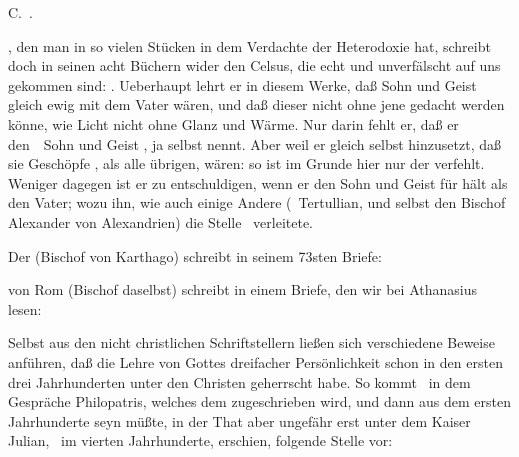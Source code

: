\vabst C.~.
\begin{aufza}
\item {}, den man in so vielen Stücken in dem Verdachte der Heterodoxie hat, schreibt doch in seinen acht Büchern wider den Celsus, die echt und unverfälscht auf uns gekommen sind: . Ueberhaupt lehrt er in diesem Werke, daß Sohn und Geist gleich ewig mit dem Vater wären, und daß dieser nicht ohne jene gedacht werden könne, wie Licht nicht ohne Glanz und Wärme. Nur darin fehlt er, daß er den~\ Sohn und Geist , ja selbst  nennt. Aber weil er gleich selbst hinzusetzt, daß sie Geschöpfe , als alle übrigen, wären: so ist im Grunde hier nur der  verfehlt. Weniger dagegen ist er zu entschuldigen, wenn er den Sohn und Geist für  hält als den Vater; wozu ihn, wie auch einige Andere (\zB\ Tertullian, und selbst den Bischof Alexander von Alexandrien) die Stelle \ verleitete.
\item Der  (Bischof von Karthago) schreibt in seinem 73sten Briefe: 
\item {} von Rom (Bischof daselbst) schreibt in einem Briefe, den wir bei Athanasius lesen: 
\end{aufza}

\begin{RWanm} 
Selbst aus den nicht christlichen Schriftstellern ließen sich verschiedene Beweise anführen, daß die Lehre von Gottes dreifacher Persönlichkeit schon in den ersten drei Jahrhunderten unter den Christen geherrscht habe. So kommt \zB\ in dem Gespräche Philopatris, welches dem  zugeschrieben wird, und dann aus dem ersten Jahrhunderte seyn müßte, in der That aber ungefähr erst unter dem Kaiser Julian, \dh\ im vierten Jahrhunderte, erschien, folgende Stelle vor:  ~
\end{RWanm} 

